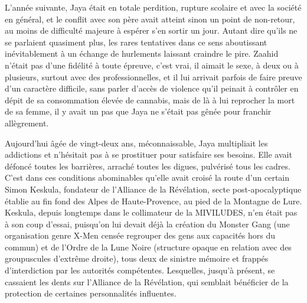 L’année suivante, Jaya était en totale perdition, rupture scolaire et avec la société en général, et le conflit avec son père avait atteint sinon un point de non-retour, au moins de difficulté majeure à espérer s’en sortir un jour. Autant dire qu’ils ne se parlaient quasiment plus, les rares tentatives dans ce sens aboutissant inévitablement à un échange de hurlements laissant craindre le pire. Zaahid n’était pas d’une fidélité à toute épreuve, c’est vrai, il aimait le sexe, à deux ou à plusieurs, surtout avec des professionnelles, et il lui arrivait parfois de faire preuve d’un caractère difficile, sans parler d’accès de violence qu’il peinait à contrôler en dépit de sa consommation élevée de cannabis, mais de là à lui reprocher la mort de sa femme, il y avait un pas que Jaya ne s’était pas gênée pour franchir allègrement.

Aujourd’hui âgée de vingt-deux ans, méconnaissable, Jaya multipliait les addictions et n’hésitait pas à se prostituer pour satisfaire ses besoins. Elle avait défoncé toutes les barrières, arraché toutes les digues, pulvérisé tous les cadres. C’est dans ces conditions abominables qu’elle avait croisé la route d’un certain Simon Keskula, fondateur de l’Alliance de la Révélation, secte post-apocalyptique établie au fin fond des Alpes de Haute-Provence, au pied de la Montagne de Lure. Keskula, depuis longtemps dans le collimateur de la MIVILUDES, n’en était pas à son coup d’essai, puisqu’on lui devait déjà la création du Monster Gang (une organisation genre X-Men censée regrouper des gens aux capacités hors du commun) et de l’Ordre de la Lune Noire (structure opaque en relation avec des groupuscules d’extrême droite), tous deux de sinistre mémoire et frappés d’interdiction par les autorités compétentes. Lesquelles, jusqu’à présent, se cassaient les dents sur l’Alliance de la Révélation, qui semblait bénéficier de la protection de certaines personnalités influentes.

